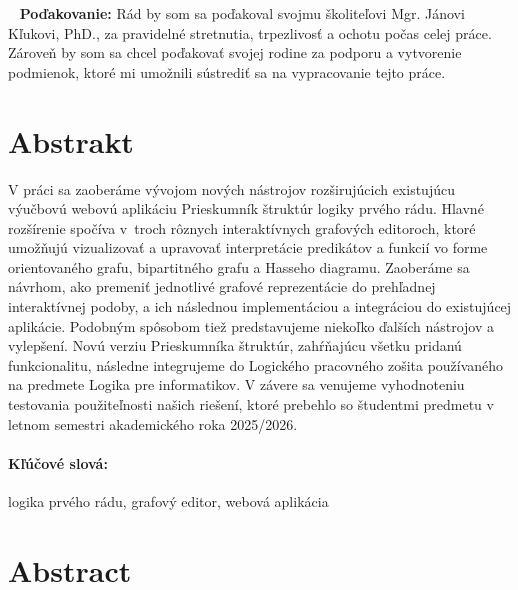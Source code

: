 \documentclass[12pt, twoside]{book}
\begin{document}


\newpage
\pagestyle{plain}
~
%
\vfill
{\bf Poďakovanie:} Rád by som sa poďakoval svojmu školiteľovi Mgr. Jánovi Kľukovi, PhD., za pravidelné stretnutia, trpezlivosť a ochotu počas celej práce. Zároveň by som sa chcel poďakovať svojej rodine za podporu a vytvorenie podmienok, ktoré mi umožnili sústrediť sa na vypracovanie tejto práce.


\newpage
\section*{Abstrakt}
%
%

V práci sa zaoberáme vývojom nových nástrojov rozširujúcich existujúcu výučbovú webovú aplikáciu Prieskumník štruktúr logiky prvého rádu.
Hlavné rozšírenie spočíva v~troch rôznych interaktívnych grafových editoroch, ktoré umožňujú vizualizovať a upravovať interpretácie predikátov a funkcií vo forme orientovaného grafu, bipartitného grafu a Hasseho diagramu. Zaoberáme sa návrhom, ako premeniť jednotlivé grafové reprezentácie do prehľadnej interaktívnej podoby, a ich následnou implementáciou a integráciou do existujúcej aplikácie. Podobným spôsobom tiež predstavujeme niekoľko ďalších nástrojov a vylepšení. Novú verziu Prieskumníka štruktúr, zahŕňajúcu všetku pridanú funkcionalitu, následne integrujeme do Logického pracovného zošita používaného na predmete Logika pre informatikov. V závere sa venujeme vyhodnoteniu testovania použiteľnosti našich riešení, ktoré prebehlo so študentmi predmetu v letnom semestri akademického roka 2025/2026.


\paragraph*{Kľúčové slová:} logika prvého rádu, grafový editor, webová aplikácia


\newpage
\section*{Abstract}
\end{document}
